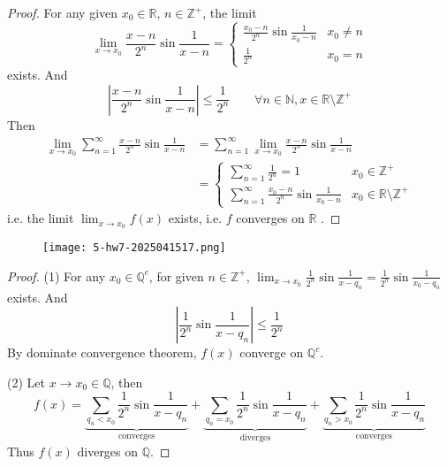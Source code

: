 \begin{proof}
For any given $x_0\in \mathbb{R}$, $n\in \mathbb{Z}^{+}$, the limit
\[
\lim_{ x \to x_0 }\frac{x-n}{2^{n}}\sin\frac{1}{x-n}=\begin{cases}
\frac{x_0-n}{2^{n}}\sin\frac{1}{x_0-n} & x_0\neq n \\
\frac{1}{2^{n}} & x_0=n
\end{cases}
\]
exists. And
\[
\left\lvert  \frac{x-n}{2^{n}}\sin\frac{1}{x-n}  \right\rvert \leq \frac{1}{2^{n}}\qquad \forall n\in \mathbb{N},x\in \mathbb{R}\setminus \mathbb{Z}^{+}
\]
Then
\[
\begin{aligned}
\lim_{ x \to x_0 } \sum_{n=1}^{\infty} \frac{x-n}{2^{n}}\sin\frac{1}{x-n} & =\sum_{n=1}^{\infty} \lim_{ x \to x_0 } \frac{x-n}{2^{n}}\sin\frac{1}{x-n} \\
 & =\begin{cases}
\sum_{n=1}^{\infty} \frac{1}{2^{n}}=1 & x_0\in \mathbb{Z}^{+} \\
\sum_{n=1}^{\infty} \frac{x_0-n}{2^{n}}\sin\frac{1}{x_0-n} & x_0\in \mathbb{R}\setminus \mathbb{Z}^{+}
\end{cases}
\end{aligned}
\]
i.e. the limit $\lim_{ x \to x_0 }f(x)$ exists, i.e. $f$ converges on $\mathbb{R}$ .

\end{proof}

\begin{exercise}
\begin{figure}[H]
\centering
\texttt{[image: 5-hw7-2025041517.png]}
\label{}
\end{figure}
\end{exercise}
\begin{proof}
(1)
For any $x_0\in \mathbb{Q}^{c}$, for given $n\in \mathbb{Z}^{+}$, $\lim_{ x \to x_0 }\frac{1}{2^{n}}\sin\frac{1}{x-q_n}=\frac{1}{2^{n}}\sin\frac{1}{x_0-q_n}$ exists. And
\[
\left\lvert  \frac{1}{2^{n}}\sin\frac{1}{x-q_n}  \right\rvert \leq \frac{1}{2^{n}}
\]
By dominate convergence theorem, $f(x)$ converge on $\mathbb{Q}^{c}$.

(2)
Let $x\to x_0\in \mathbb{Q}$, then
\[
f(x)=\underbrace{ \sum_{q_n<x_0}\frac{1}{2^{n}}\sin\frac{1}{x-q_n} }_{ \text{converges} }+\underbrace{ \sum_{q_n=x_0}\frac{1}{2^{n}}\sin\frac{1}{x-q_n} }_{ \text{diverges} }+\underbrace{ \sum_{q_n>x_0}\frac{1}{2^{n}}\sin\frac{1}{x-q_n} }_{ \text{converges} }
\]
Thus $f(x)$ diverges on $\mathbb{Q}$.

\end{proof}

